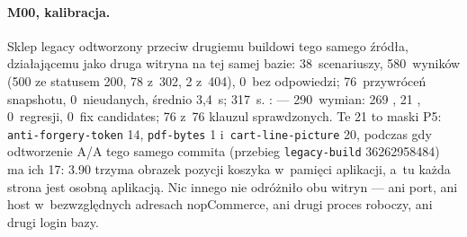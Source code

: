 \paragraph{M00, kalibracja.} Sklep legacy odtworzony przeciw drugiemu buildowi tego samego
źródła, działającemu jako druga witryna na tej samej bazie: 38~scenariuszy, 580~wyników
(500 ze statusem 200, 78 z~302, 2 z~404), 0~bez odpowiedzi; 76~przywróceń snapshotu,
0~nieudanych, średnio 3,4~s; 317~s. :  --- 290~wymian:
269 , 21 , 0~regresji, 0~fix candidates;
76 z~76 klauzul sprawdzonych. Te 21 to maski P5: \texttt{anti-forgery-token} 14,
\texttt{pdf-bytes} 1 i~\texttt{cart-line-picture} 20, podczas gdy odtworzenie A/A tego samego
commita (przebieg \texttt{legacy-build} 36262958484) ma ich 17: 3.90 trzyma obrazek pozycji
koszyka w~pamięci aplikacji, a~tu każda strona jest osobną aplikacją. Nic innego nie
odróżniło obu witryn --- ani port, ani host w~bezwzględnych adresach nopCommerce, ani drugi
proces roboczy, ani drugi login bazy.

